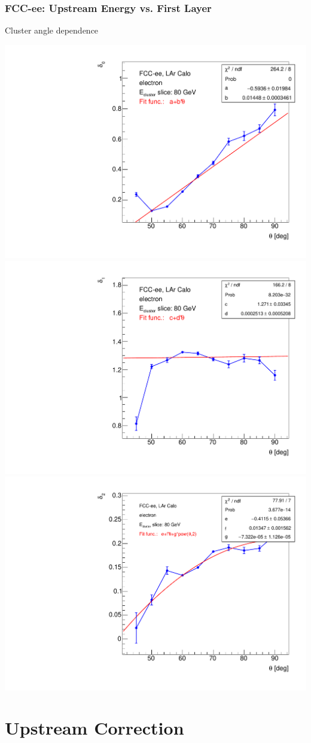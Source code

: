 \documentclass[aspectratio=169]{beamer}
\newcommand{\redtext}[1]{%
  \textcolor{myRed}{#1}
}
\begin{document}
\begin{frame}
  \frametitle{FCC-ee: Upstream Energy vs. First Layer}

  \centering
  \redtext{Cluster angle dependence} \\[1.5ex]
  \begin{adjustwidth}{-5mm}{-5mm}
    \includegraphics[width=0.32\linewidth]{figures/2d/graph_downstream_theta_delta_0_80gev.pdf}
    \includegraphics[width=0.32\linewidth]{figures/2d/graph_downstream_theta_delta_1_80gev.pdf}
    \includegraphics[width=0.32\linewidth]{figures/2d/graph_downstream_theta_delta_2_80gev.pdf}
  \end{adjustwidth}
\end{frame}


\section{Upstream Correction}
\end{document}
